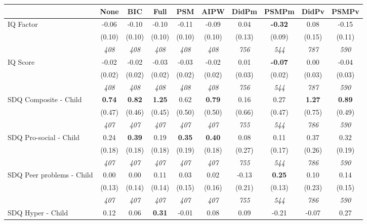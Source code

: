 \begin{tabular}{l c c c c c c c c c}
\toprule
 & None & BIC & Full & PSM & AIPW & DidPm & PSMPm & DidPv & PSMPv \\
\midrule
IQ Factor & -0.06 & -0.10 & -0.10 & -0.11 & -0.09 & 0.04 & \textbf{-0.32} & 0.08 & -0.15 \\
& (0.10) & (0.10) & (0.10) & (0.10) & (0.10) & (0.13) & (0.09) & (0.15) & (0.11) \\
& \textit{ 408 } & \textit{ 408 } & \textit{ 408 } & \textit{ 408 } & \textit{ 408 } & \textit{ 756 } & \textit{ 544 } & \textit{ 787 } & \textit{ 590 } \\
IQ Score & -0.02 & -0.02 & -0.03 & -0.03 & -0.02 & 0.01 & \textbf{-0.07} & 0.00 & -0.04 \\
& (0.02) & (0.02) & (0.02) & (0.02) & (0.02) & (0.03) & (0.02) & (0.03) & (0.03) \\
& \textit{ 408 } & \textit{ 408 } & \textit{ 408 } & \textit{ 408 } & \textit{ 408 } & \textit{ 756 } & \textit{ 544 } & \textit{ 787 } & \textit{ 590 } \\
SDQ Composite - Child & \textbf{ 0.74 } & \textbf{ 0.82 } & \textbf{ 1.25 } & 0.62 & \textbf{0.79} & 0.16 & 0.27 & \textbf{ 1.27 } & \textbf{0.89} \\
& (0.47) & (0.46) & (0.45) & (0.50) & (0.50) & (0.66) & (0.47) & (0.75) & (0.49) \\
& \textit{ 407 } & \textit{ 407 } & \textit{ 407 } & \textit{ 407 } & \textit{ 407 } & \textit{ 755 } & \textit{ 544 } & \textit{ 786 } & \textit{ 590 } \\
SDQ Pro-social - Child & 0.24 & \textbf{ 0.39 } & 0.19 & \textbf{0.35} & \textbf{0.40} & 0.08 & 0.11 & 0.37 & 0.32 \\
& (0.18) & (0.18) & (0.18) & (0.19) & (0.18) & (0.27) & (0.17) & (0.26) & (0.19) \\
& \textit{ 407 } & \textit{ 407 } & \textit{ 407 } & \textit{ 407 } & \textit{ 407 } & \textit{ 755 } & \textit{ 544 } & \textit{ 786 } & \textit{ 590 } \\
SDQ Peer problems - Child & 0.00 & 0.00 & 0.11 & 0.03 & 0.02 & -0.13 & \textbf{0.25} & 0.10 & 0.14 \\
& (0.13) & (0.14) & (0.14) & (0.15) & (0.16) & (0.21) & (0.13) & (0.23) & (0.15) \\
& \textit{ 407 } & \textit{ 407 } & \textit{ 407 } & \textit{ 407 } & \textit{ 407 } & \textit{ 755 } & \textit{ 544 } & \textit{ 786 } & \textit{ 590 } \\
SDQ Hyper - Child & 0.12 & 0.06 & \textbf{ 0.31 } & -0.01 & 0.08 & 0.09 & -0.21 & -0.07 & 0.27 \\

\end{tabular}
